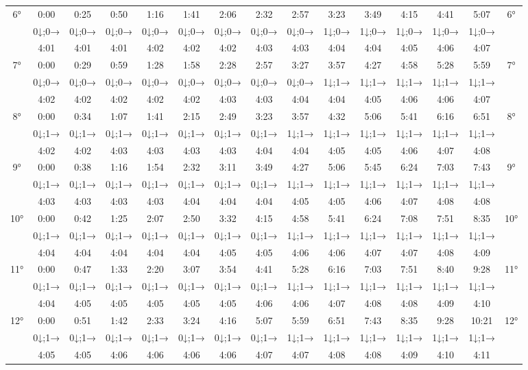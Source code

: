 \begin{scriptsize}
\begin{tabular}{c || c | c | c | c | c | c | c | c | c | c | c | c | c || c}
		\multirow{3}{*}{6°}&0:00&0:25&0:50&1:16&1:41&2:06&2:32&2:57&3:23&3:49&4:15&4:41&5:07&\multirow{3}{*}{6°}\\ \space&0↓;0→&0↓;0→&0↓;0→&0↓;0→&0↓;0→&0↓;0→&0↓;0→&0↓;0→&1↓;0→&1↓;0→&1↓;0→&1↓;0→&1↓;0→&\space\\&4:01&4:01&4:01&4:02&4:02&4:02&4:03&4:03&4:04&4:04&4:05&4:06&4:07&\space\\\hline
		\multirow{3}{*}{7°}&0:00&0:29&0:59&1:28&1:58&2:28&2:57&3:27&3:57&4:27&4:58&5:28&5:59&\multirow{3}{*}{7°}\\ \space&0↓;0→&0↓;0→&0↓;0→&0↓;0→&0↓;0→&0↓;0→&0↓;0→&0↓;0→&1↓;1→&1↓;1→&1↓;1→&1↓;1→&1↓;1→&\space\\&4:02&4:02&4:02&4:02&4:02&4:03&4:03&4:04&4:04&4:05&4:06&4:06&4:07&\space\\\hline
		\multirow{3}{*}{8°}&0:00&0:34&1:07&1:41&2:15&2:49&3:23&3:57&4:32&5:06&5:41&6:16&6:51&\multirow{3}{*}{8°}\\ \space&0↓;1→&0↓;1→&0↓;1→&0↓;1→&0↓;1→&0↓;1→&0↓;1→&1↓;1→&1↓;1→&1↓;1→&1↓;1→&1↓;1→&1↓;1→&\space\\&4:02&4:02&4:03&4:03&4:03&4:03&4:04&4:04&4:05&4:05&4:06&4:07&4:08&\space\\\hline
		\multirow{3}{*}{9°}&0:00&0:38&1:16&1:54&2:32&3:11&3:49&4:27&5:06&5:45&6:24&7:03&7:43&\multirow{3}{*}{9°}\\ \space&0↓;1→&0↓;1→&0↓;1→&0↓;1→&0↓;1→&0↓;1→&0↓;1→&1↓;1→&1↓;1→&1↓;1→&1↓;1→&1↓;1→&1↓;1→&\space\\&4:03&4:03&4:03&4:03&4:04&4:04&4:04&4:05&4:05&4:06&4:07&4:08&4:08&\space\\\hline
		\multirow{3}{*}{10°}&0:00&0:42&1:25&2:07&2:50&3:32&4:15&4:58&5:41&6:24&7:08&7:51&8:35&\multirow{3}{*}{10°}\\ \space&0↓;1→&0↓;1→&0↓;1→&0↓;1→&0↓;1→&0↓;1→&0↓;1→&1↓;1→&1↓;1→&1↓;1→&1↓;1→&1↓;1→&1↓;1→&\space\\&4:04&4:04&4:04&4:04&4:04&4:05&4:05&4:06&4:06&4:07&4:07&4:08&4:09&\space\\\hline
		\multirow{3}{*}{11°}&0:00&0:47&1:33&2:20&3:07&3:54&4:41&5:28&6:16&7:03&7:51&8:40&9:28&\multirow{3}{*}{11°}\\ \space&0↓;1→&0↓;1→&0↓;1→&0↓;1→&0↓;1→&0↓;1→&0↓;1→&1↓;1→&1↓;1→&1↓;1→&1↓;1→&1↓;1→&1↓;1→&\space\\&4:04&4:05&4:05&4:05&4:05&4:05&4:06&4:06&4:07&4:08&4:08&4:09&4:10&\space\\\hline
		\multirow{3}{*}{12°}&0:00&0:51&1:42&2:33&3:24&4:16&5:07&5:59&6:51&7:43&8:35&9:28&10:21&\multirow{3}{*}{12°}\\ \space&0↓;1→&0↓;1→&0↓;1→&0↓;1→&0↓;1→&0↓;1→&0↓;1→&1↓;1→&1↓;1→&1↓;1→&1↓;1→&1↓;1→&1↓;1→&\space\\&4:05&4:05&4:06&4:06&4:06&4:06&4:07&4:07&4:08&4:08&4:09&4:10&4:11&\space\\\hline

\end{tabular}
\end{scriptsize}
